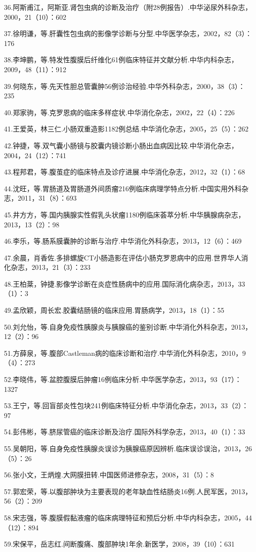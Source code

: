 36.阿斯甫江，阿斯亚.肾包虫病的诊断及治疗（附28例报告）.中华泌尿外科杂志，2000，21（10）：602

37.徐明谦，等.肝囊性包虫病的影像学诊断与分型.中华医学杂志，2002，82（3）：176

38.李坤鹏，等.特发性腹膜后纤维化61例临床特征并文献分析.中华内科杂志，2009，48（11）：912

39.何晓东，等.先天性胆总管囊肿56例诊治经验.中华外科杂志，2000，38（3）：235

40.郑家驹，等.克罗恩病的临床多样症状.中华消化杂志，2002，22（4）：226

41.王爱英，林三仁.小肠双重造影1182例总结.中华消化杂志，2005，25（5）：262

42.钟捷，等.双气囊小肠镜与胶囊内镜诊断小肠出血病因比较.中华消化杂志，2004，24（12）：741

43.程邦君，等.腹茧症的临床特点及诊疗进展.中华消化杂志，2012，32（1）：68

44.沈旺，等.胃肠道及胃肠道外间质瘤216例临床病理学特点分析.中国实用外科杂志，2011，31（8）：693

45.井方方，等.国内胰腺实性假乳头状瘤1180例临床荟萃分析.中华胰腺病杂志，2013，13（2）：98

46.李乐，等.肠系膜囊肿的诊断与治疗.中华消化外科杂志，2013，12（6）：469

47.余晨，肖香佐.多排螺旋CT小肠造影在评估小肠克罗恩病中的应用.世界华人消化杂志，2013，21（3）：233

48.王柏棻，钟捷.影像学诊断在炎症性肠病中的应用.国际消化病杂志，2013，33（1）：3

49.孟欣颖，周长宏.胶囊结肠镜的临床应用.胃肠病学，2013，18（1）：55

50.刘允怡，等.自身免疫性胰腺炎与胰腺癌的鉴别诊断.中华消化外科杂志，2013，12（2）：96

51.方薛泉，等.腹部Castleman病的临床诊断和治疗.中华消化外科杂志，2010，9（4）：273

52.李晓伟，等.盆腔腹膜后肿瘤16例临床分析.中华医学杂志，2013，93（17）：1327

53.王宁，等.回盲部炎性包块241例临床特征分析.中华消化杂志，2013，33（2）：97

54.彭伟彬，等.脐尿管癌的临床诊断及治疗.国际外科学杂志，2013，40（1）：33

55.吴朝阳，等.自身免疫性胰腺炎误诊为胰腺癌原因辨析.临床误诊误治，2013，26（5）：26

56.张小文，王炳煌.大网膜扭转.中国医师进修杂志，2008，31（5）：8

57.郭宏荣，等.以腹部肿块为主要表现的老年缺血性结肠炎16例.人民军医，2013，56（2）：209

58.宋志强，等.腹膜假黏液瘤的临床病理特征和预后分析.中华内科杂志，2005，44（12）：894

59.宋保平，岳志红.间断腹痛、腹部肿块1年余.新医学，2008，39（10）：631

\protect\hypertarget{text00238.html}{}{}

